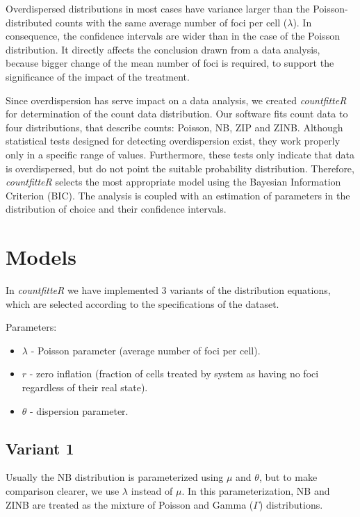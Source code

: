 Overdispersed distributions in most cases have variance larger than the Poisson-distributed counts with the same average number of foci per cell ($\lambda$). In consequence, the confidence intervals are wider than in the case of the Poisson distribution. It directly affects the conclusion drawn from a data analysis, because bigger change of the mean number of foci is required, to support the significance of the impact of the treatment. 

Since overdispersion has serve impact on a data analysis, we created \emph{countfitteR} for determination of the count data distribution. Our software fits count data to four distributions, that describe counts: Poisson, NB, ZIP and ZINB. Although statistical tests designed for detecting overdispersion exist, they work properly only in a specific range of values. Furthermore, these tests only indicate that data is overdispersed, but do not point the suitable probability distribution. Therefore, \emph{countfitteR} selects the most appropriate model using the Bayesian Information Criterion (BIC). The analysis is coupled with an estimation of parameters in the distribution of choice and their confidence intervals.  

\section{Models}

In \emph{countfitteR} we have implemented 3 variants of the distribution equations, which are selected according to the specifications of the dataset. %

Parameters:
\begin{itemize}
\item $\lambda$ - Poisson parameter (average number of foci per cell). 
\item $r$ - zero inflation (fraction of cells treated by system as having no foci regardless of their real state).
\item $\theta$ - dispersion parameter.
\end{itemize}

\subsection{Variant 1}

Usually the NB distribution is parameterized using $\mu$ and $\theta$, but to make comparison clearer, we use $\lambda$ instead of $\mu$. In this parameterization, NB and ZINB are treated as the mixture of Poisson and Gamma ($\Gamma$) distributions.  

